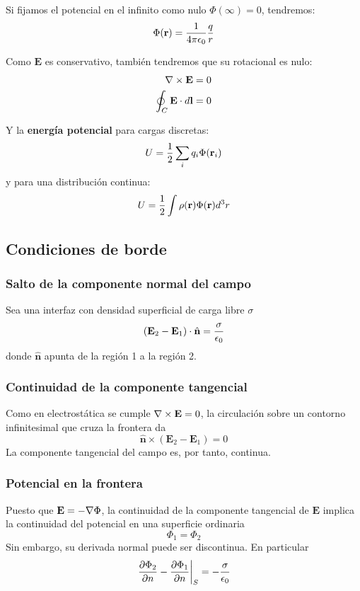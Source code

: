\documentclass[]{article}
\numberwithin{equation}{section}
\begin{document}
Si fijamos el potencial en el infinito como nulo \(\Phi(\infty) = 0\), tendremos:
\begin{equation}
	\Phi(\rv) = \ke\frac{q}{r}
\end{equation}

Como \(\mathbf{E}\) es conservativo, también tendremos que su rotacional es nulo:
\begin{align}
	\nabla\times\mathbf{E} &= 0\\
	\oint_C\mathbf{E}\cdot d\mathbf{l} &= 0
\end{align}

Y la \textbf{energía potencial} para cargas discretas:
\begin{equation}
	U=\frac{1}{2}\sum_{i}q_i\Phi(\mathbf{r}_i)
\end{equation}
y para una distribución continua:
\begin{equation}
	U = \frac{1}{2}\int\rho(\mathbf{r})\Phi(\mathbf{r})d^3r
\end{equation}

\subsection{Condiciones de borde}
\subsubsection{Salto de la componente normal del campo}
Sea una interfaz con densidad superficial de carga libre \(\sigma\)
\begin{equation}
	(\mathbf{E}_2 - \mathbf{E}_1)\cdot\hat{\mathbf{n}} = \frac{\sigma}{\epsilon_{0}}
\end{equation}
donde \(\hat{\mathbf{n}}\) apunta de la región 1 a la región 2. 

\subsubsection{Continuidad de la componente tangencial}
Como en electrostática se cumple \(\nabla\times \mathbf{E} = 0\), la circulación sobre un contorno infinitesimal que cruza la frontera da
\begin{equation}
	\hat{\mathbf{n}}\times(\mathbf{E}_2 - \mathbf{E}_1) = 0
\end{equation}
La componente tangencial del campo es, por tanto, continua. 

\subsubsection{Potencial en la frontera}
Puesto que \(\mathbf{E} = -\nabla\Phi\), la continuidad de la componente tangencial de \(\mathbf{E}\) implica la continuidad del potencial en una superficie ordinaria
\begin{equation}
	\Phi_1 = \Phi_2
\end{equation}
Sin embargo, su derivada normal puede ser discontinua. En particular
\begin{equation}
	\left. \frac{\partial\Phi_2}{\partial n} - \frac{\partial\Phi_1}{\partial n}\right|_S = - \frac{\sigma}{\epsilon_{0}}
\end{equation}
\end{document}
